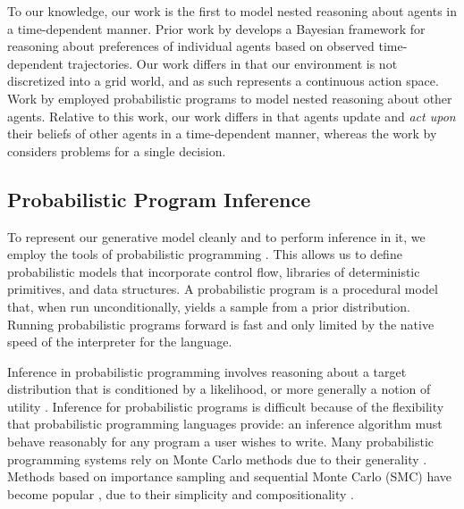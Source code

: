 \documentclass{article}
\begin{document}
To our knowledge, our work is the first to model nested reasoning about agents in a time-dependent manner. Prior work by \citet{baker2009action} develops a Bayesian framework for reasoning about preferences of individual agents based on observed time-dependent trajectories. Our work differs in that our environment is not discretized into a grid world, and as such represents a continuous action space. Work by \citet{stuhlmuller2014reasoning} employed probabilistic programs to model nested reasoning about other agents. 
Relative to this work, our work differs in that agents update and \textit{act upon} their beliefs of other agents in a time-dependent manner, whereas the work by \citet{stuhlmuller2014reasoning} considers problems for a single decision.




\vspace{-0.33em}
\subsection{Probabilistic Program Inference}
\vspace{-0.33em}

To represent our generative model cleanly and to perform inference in it, we employ the tools of probabilistic programming \cite{vandemeent2018introduction}. This allows us to define probabilistic models that incorporate control flow, libraries of deterministic primitives, and data structures. %
A probabilistic program is a procedural model that, when run unconditionally, yields a sample from a prior distribution. Running probabilistic programs forward is fast and only limited by the native speed of the interpreter for the language.

Inference in probabilistic programming involves reasoning about a target distribution that is conditioned by a likelihood, or more generally a notion of utility \cite{vandemeent2018introduction}.
Inference for probabilistic programs is difficult because of the flexibility that probabilistic programming languages provide: an inference algorithm must behave reasonably for any program a user wishes to write. Many probabilistic programming systems rely on Monte Carlo methods due to their generality \cite{goodman08,milch05,pfeffer01,standevelopmentteam2014stan,venture}. Methods based on importance sampling and sequential Monte Carlo (SMC) have become popular \cite{murray2013,todeschini2014biips,wood-aistats-2014,goodman2014dippl,ge2016turing}, due to their simplicity and compositionality \cite{naesseth2015nested}.
\end{document}
